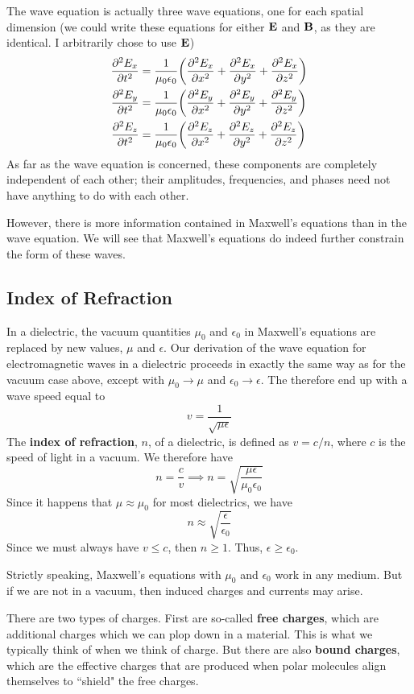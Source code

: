 The wave equation is actually three wave equations, one for each spatial dimension (we could write these equations for either $\mathbf{E}$ and $\mathbf{B}$, as they are identical. I arbitrarily chose to use $\mathbf{E}$)
\begin{align*}
    \pdv[2]{E_x}{t} &= \frac{1}{\mu_0\epsilon_0} \pqty{\pdv[2]{E_x}{x} + \pdv[2]{E_x}{y} + \pdv[2]{E_x}{z}} \\
    \pdv[2]{E_y}{t} &= \frac{1}{\mu_0\epsilon_0} \pqty{\pdv[2]{E_y}{x} + \pdv[2]{E_y}{y} + \pdv[2]{E_y}{z}} \\
    \pdv[2]{E_z}{t} &= \frac{1}{\mu_0\epsilon_0} \pqty{\pdv[2]{E_z}{x} + \pdv[2]{E_z}{y} + \pdv[2]{E_z}{z}}
\end{align*}
As far as the wave equation is concerned, these components are completely independent of each other; their amplitudes, frequencies, and phases need not have anything to do with each other.

However, there is more information contained in Maxwell's equations than in the wave equation. We will see that Maxwell's equations do indeed further constrain the form of these waves.
\subsection*{Index of Refraction}
In a dielectric, the vacuum quantities $\mu_0$ and $\epsilon_0$ in Maxwell's equations are replaced by new values, $\mu$ and $\epsilon$. Our derivation of the wave equation for electromagnetic waves in a dielectric proceeds in exactly the same way as for the vacuum case above, except with $\mu_0\to \mu$ and $\epsilon_0\to\epsilon$. The therefore end up with a wave speed equal to
\[ v = \frac{1}{\sqrt{\mu \epsilon}} \]
The \textbf{index of refraction}, $n$, of a dielectric, is defined as $v = c/n$, where $c$ is the speed of light in a vacuum. We therefore have
\[ n = \frac{c}{v} \implies \boxed{n = \sqrt{\frac{\mu\epsilon}{\mu_0\epsilon_0}}}\]
Since it happens that $\mu \approx \mu_0$ for most dielectrics, we have
\[ n \approx \sqrt{\frac{\epsilon}{\epsilon_0}}\]
Since we must always have $v \le c$, then $n \ge 1$. Thus, $\epsilon \ge \epsilon_0$.

Strictly speaking, Maxwell's equations with $\mu_0$ and $\epsilon_0$ work in any medium. But if we are not in a vacuum, then induced charges and currents may arise.

There are two types of charges. First are so-called \textbf{free charges}, which are additional charges which we can plop down in a material. This is what we typically think of when we think of charge. But there are also \textbf{bound charges}, which are the effective charges that are produced when polar molecules align themselves to ``shield" the free charges.

